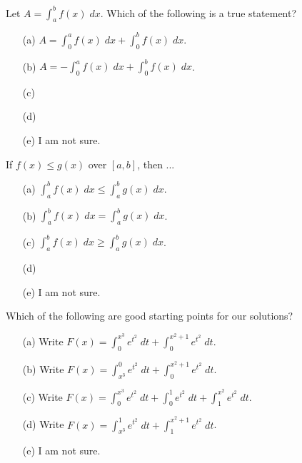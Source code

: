 \documentclass[14pt]{beamer}
\begin{document}
\begin{frame}[t]
  Let \(A = \int_{a}^{b} f(x) \;dx\). Which of the following is a true statement?

  \begin{itemize} \setlength\itemsep{1ex}
    \item[(a)] \(A = \int_{0}^{a} f(x) \;dx + \int_{0}^{b} f(x) \;dx\).
    \item[(b)] \(A = -\int_{0}^{a} f(x) \;dx + \int_{0}^{b} f(x) \;dx\).
    \item[(c)] 
    \item[(d)] 
    \item[(e)] I am not sure.
  \end{itemize} 
\end{frame}

\begin{frame}[t]
  If \(f(x) \le g(x)\) over \([a,b]\), then ...

  \begin{itemize} \setlength\itemsep{1ex}
    \item[(a)] \(\int_{a}^{b} f(x) \;dx \le \int_{a}^{b} g(x) \;dx\).
    \item[(b)] \(\int_{a}^{b} f(x) \;dx = \int_{a}^{b} g(x) \;dx\).
    \item[(c)] \(\int_{a}^{b} f(x) \;dx \ge \int_{a}^{b} g(x) \;dx\).
    \item[(d)] 
    \item[(e)] I am not sure.
  \end{itemize} 
\end{frame}

\begin{frame}[t]
  Which of the following are good starting points for our solutions?

  \begin{enumerate} \setlength\itemsep{1ex}
    \item[(a)] Write \(F(x) = \int_{0}^{x^{3}} e^{t^{2}} \;dt + \int_{0}^{x^{2}+1} e^{t^{2}} \;dt \).
    \item[(b)] Write \(F(x) = \int_{x^{3}}^{0} e^{t^{2}} \;dt + \int_{0}^{x^{2}+1} e^{t^{2}} \;dt \).
    \item[(c)] Write \(F(x) = \int_{0}^{x^{3}} e^{t^{2}} \;dt + \int_{0}^{1} e^{t^{2}} \;dt + \int_{1}^{x^{2}} e^{t^{2}} \;dt\).
    \item[(d)] Write \(F(x) = \int_{x^{3}}^{1} e^{t^{2}} \;dt + \int_{1}^{x^{2}+1} e^{t^{2}} \;dt \).
    \item[(e)] I am not sure.
  \end{enumerate}
\end{frame}
\end{document}
